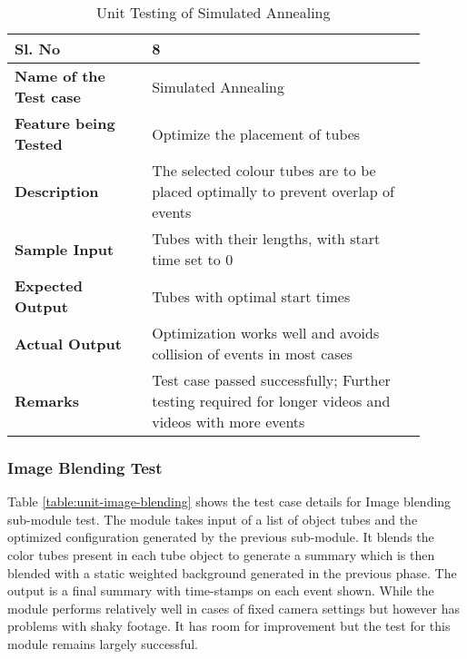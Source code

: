         \FloatBarrier
        \begin{table}[H]
            \caption{Unit Testing of Simulated Annealing}
            \begin{tabular}{|p{0.3\linewidth}|p{0.6\linewidth}|}
                \hline
                \textbf{Sl. No }              &\textbf{ 8}\\
                \hline
                \textbf{Name of the Test case}& Simulated Annealing \\
                \hline
                \textbf{Feature being Tested}  & Optimize the placement of tubes \\
                \hline
                \textbf{Description}           & The selected colour tubes are
                to be placed optimally to prevent overlap of events \\
                \hline
                \textbf{Sample Input}          & Tubes with their lengths, with
                start time set to 0 \\
                \hline
                \textbf{Expected Output}       & Tubes with optimal start times \\
                \hline
                \textbf{Actual Output}         & Optimization works well and
                avoids collision of events in most cases \\
                \hline
                \textbf{Remarks }              & Test case passed successfully;
                Further testing required for longer videos and videos with
                more events \\
                \hline
            \end{tabular}
            \label{table:unit-simulated-annealing}
        \end{table}


        \subsubsection{Image Blending Test}

        Table \ref{table:unit-image-blending} shows the test case details for
        Image blending sub-module test. The module takes input of a list of
        object tubes and the optimized configuration generated by the previous
        sub-module. It blends the color tubes present in each tube object to
        generate a summary which is then blended with a static weighted
        background generated in the previous phase. The output is a final
        summary with time-stamps on each event shown. While the module performs
        relatively well in cases of fixed camera settings but however has
        problems with shaky footage. It has room for improvement but the test
        for this module remains largely successful.

